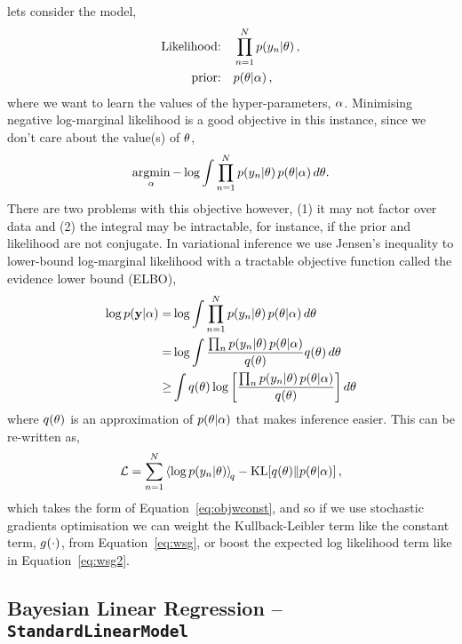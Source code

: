 \documentclass[11pt, oneside]{article}
\begin{document}
lets consider the model,
\begin{align}
    \text{Likelihood:} \quad &\prod^N_{n=1} p\!\left({y_n}\middle\vert{\ensuremath{\theta}}\right), \\
    \text{prior:} \quad &p\!\left({\theta}\middle\vert{\ensuremath{\alpha}}\right),
\end{align}
where we want to learn the values of the hyper-parameters, $\alpha$. Minimising
negative log-marginal likelihood is a good objective in this instance, since we
don't care about the value(s) of $\theta$,
\begin{equation}
    \argmin_\hyper - \log \int \prod^N_{n=1} \probC{\targs_n}{\param}
    \probC{\param}{\hyper} d \param.
    \label{eq:lml}
\end{equation}
There are two problems with this objective however, (1) it may not factor over
data and (2) the integral may be intractable, for instance, if the prior and
likelihood are not conjugate. In variational inference we use Jensen's
inequality to lower-bound log-marginal likelihood with a tractable objective
function called the evidence lower bound (ELBO),
\begin{align}
    \log \probC{\targ}{\hyper} =& \log \int 
        \prod^N_{n=1} \probC{\targs_n}{\param} 
        \probC{\param}{\hyper} d \param \nonumber \\
        =& \log \int 
        \frac{\prod_n \probC{\targs_n}{\param} \probC{\param}{\hyper}}
        {\qrob{\param}} \qrob{\param} d \param \nonumber \\
        \geq& \int \qrob{\param} \log \sbrac{%
            \frac{\prod_n \probC{\targs_n}{\param} 
            \probC{\param}{\hyper}}{\qrob{\param}}}
        d \param
\end{align}
where $q\!\left({\theta}\right)$ is an approximation of $p\!\left({\theta}\middle\vert{\ensuremath{\alpha}}\right)$ that 
makes inference easier. This can be re-written as,
\begin{equation}
    \elbo = \sum^N_{n=1} \expec{q}{\log\probC{\targs_n}{\param}} -
    \KL{\qrob{\param}}{\probC{\param}{\hyper}},
    \label{eq:elbo}
\end{equation}
which takes the form of Equation~\eqref{eq:objwconst}, and so if we use
stochastic gradients optimisation we can weight the Kullback-Leibler term like
the constant term, ${g}_{}\!\left({{\cdot}}\right)$, from Equation~\eqref{eq:wsg}, or boost
the expected log likelihood term like in Equation~\eqref{eq:wsg2}.


\subsection{Bayesian Linear Regression -- \texttt{StandardLinearModel}}
\end{document}
